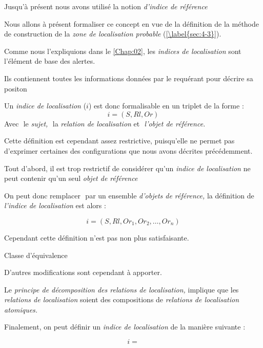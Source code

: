 
Jusqu'à présent nous avons utilisé la notion \emph{d'indice de
  référence}

Nous allons à présent formaliser ce concept en vue de la définition de
la méthode de construction de la \emph{zone de localisation probable}
(\autoref{\label{sec:4-3}}).

Comme nous l'expliquions dans le \autoref{Chap:02}, les \emph{indices
  de localisation} sont l'élément de base des alertes.

Ils contiennent toutes les informations données par le requérant pour
décrire sa positon

Un \emph{indice de localisation} (\(i\)) est donc formalisable en un
triplet de la forme :
%
\begin{equation}
  i = (S, Rl, Or)
\end{equation}
%
Avec \(\) le \emph{sujet,} \(\) la \emph{relation de localisation} et
\(\) \emph{l'objet de référence.}

Cette définition est cependant assez restrictive, puisqu'elle ne
permet pas d'exprimer certaines des configurations que nous avons
décrites précédemment.                                                                                                                                             

Tout d'abord, il est trop restrictif de considérer qu'un \emph{indice
  de localisation} ne peut contenir qu'un seul \emph{objet de
  référence}

On peut donc remplacer \(\) par un ensemble \emph{d'objets de
  référence,} la définition de \emph{l'indice de localisation} est
alors :

\begin{equation}
  i = (S, Rl, {Or_1, Or_2, \ldots, Or_n})
\end{equation}

Cependant cette définition n'est pas non plus satisfaisante.

Classe d'équivalence


D'autres modifications sont cependant à apporter.

Le \emph{principe de décomposition des relations de localisation,}
implique que les \emph{relations de localisation} soient des
compositions de \emph{relations de localisation atomiques.}



Finalement, on peut définir un \emph{indice de localisation} de la
manière suivante :

\begin{equation}
  i =
\end{equation}

